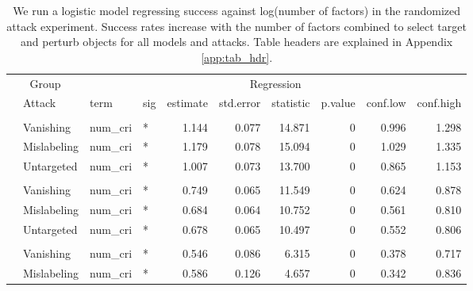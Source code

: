 \begingroup\fontsize{9}{11}\selectfont

\begin{longtable}[t]{llllrrrrrr}
\caption{\label{tab:num_cri_table}We run a logistic model regressing success against log(number of factors) in the randomized attack experiment. Success rates increase with the number of factors combined to select target and perturb objects for all models and attacks. Table headers are explained in Appendix \ref{app:tab_hdr}.}\\
\toprule
\multicolumn{2}{c}{Group} & \multicolumn{8}{c}{Regression} \\
\cmidrule(l{3pt}r{3pt}){1-2} \cmidrule(l{3pt}r{3pt}){3-10}
 & Attack & term & sig & estimate & std.error & statistic & p.value & conf.low & conf.high\\
\midrule
\addlinespace[0.3em]
\multicolumn{10}{l}{\textbf{YOLOv3}}\\
\hspace{1em} & Vanishing & num\_cri & * & 1.144 & 0.077 & 14.871 & 0 & 0.996 & 1.298\\
\cmidrule{2-10}\nopagebreak
\hspace{1em} & Mislabeling & num\_cri & * & 1.179 & 0.078 & 15.094 & 0 & 1.029 & 1.335\\
\cmidrule{2-10}\nopagebreak
\hspace{1em} & Untargeted & num\_cri & * & 1.007 & 0.073 & 13.700 & 0 & 0.865 & 1.153\\
\cmidrule{1-10}\pagebreak[0]
\addlinespace[0.3em]
\multicolumn{10}{l}{\textbf{SSD}}\\
\hspace{1em} & Vanishing & num\_cri & * & 0.749 & 0.065 & 11.549 & 0 & 0.624 & 0.878\\
\cmidrule{2-10}\nopagebreak
\hspace{1em} & Mislabeling & num\_cri & * & 0.684 & 0.064 & 10.752 & 0 & 0.561 & 0.810\\
\cmidrule{2-10}\nopagebreak
\hspace{1em} & Untargeted & num\_cri & * & 0.678 & 0.065 & 10.497 & 0 & 0.552 & 0.806\\
\cmidrule{1-10}\pagebreak[0]
\addlinespace[0.3em]
\multicolumn{10}{l}{\textbf{RetinaNet}}\\
\hspace{1em} & Vanishing & num\_cri & * & 0.546 & 0.086 & 6.315 & 0 & 0.378 & 0.717\\
\cmidrule{2-10}\nopagebreak
\hspace{1em} & Mislabeling & num\_cri & * & 0.586 & 0.126 & 4.657 & 0 & 0.342 & 0.836\\

\end{longtable}
